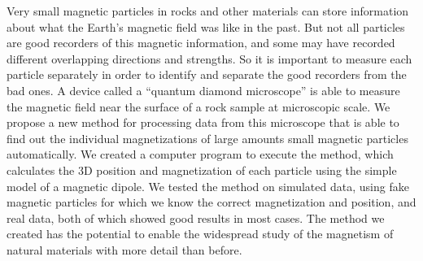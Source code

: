 Very small magnetic particles in rocks and other materials can store information about what the Earth’s magnetic field was like in the past. 
But not all particles are good recorders of this magnetic information, and some may have recorded different overlapping directions and strengths. 
So it is important to measure each particle separately in order to identify and separate the good recorders from the bad ones. 
A device called a ``quantum diamond microscope'' is able to measure the magnetic field near the surface of a rock sample at microscopic scale. 
We propose a new method for processing data from this microscope that is able to find out the individual magnetizations of large amounts small magnetic particles automatically.
We created a computer program to execute the method, which calculates the 3D position and magnetization of each particle using the simple model of a magnetic dipole. 
We tested the method on simulated data, using fake magnetic particles for which we know the correct magnetization and position, and real data, both of which showed good results in most cases. 
The method we created has the potential to enable the widespread study of the magnetism of natural materials with more detail than before.